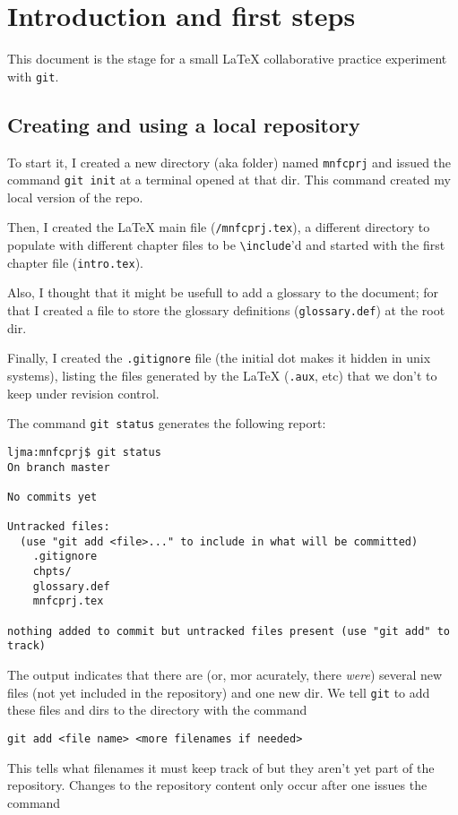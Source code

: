 \section{Introduction and first steps}
This document is the stage for a small \LaTeX{} collaborative practice
experiment with \texttt{git}.

\subsection{Creating and using a local repository}
To start it, I created a new directory (aka folder) named \texttt{mnfcprj} and
issued the command \texttt{git init} at a terminal opened at that dir. This
command created my local version of the \gls{repo}.

Then, I created the \LaTeX{} main file (\texttt{/mnfcprj.tex}), a different
directory to populate with different chapter files to be
\texttt{\textbackslash{}include}'d and started with the first chapter file
(\texttt{intro.tex}).

Also, I thought that it might be usefull to add a glossary to the document; for
that I created a file to store the glossary definitions (\texttt{glossary.def})
at the root dir. 

Finally, I created the \texttt{.gitignore} file (the initial dot makes it hidden
in unix systems), listing the files generated by the \LaTeX{} (\texttt{.aux},
etc) that we don't to keep under revision control.

The command \texttt{git status} generates the following report:
\begin{term}
\begin{verbatim}
ljma:mnfcprj$ git status
On branch master

No commits yet

Untracked files:
  (use "git add <file>..." to include in what will be committed)
	.gitignore
	chpts/
	glossary.def
	mnfcprj.tex

nothing added to commit but untracked files present (use "git add" to track)
\end{verbatim}
\end{term}
The output indicates that there are (or, mor acurately, there \emph{were})
several new files (not yet included in the repository) and one new dir. We tell
\texttt{git} to add these files and dirs to the directory with the command

\texttt{git add <file name> <more filenames if needed>}

This tells \git what filenames it must keep track of but they aren't yet part of
the repository. Changes to the repository content only occur after one issues
the command

